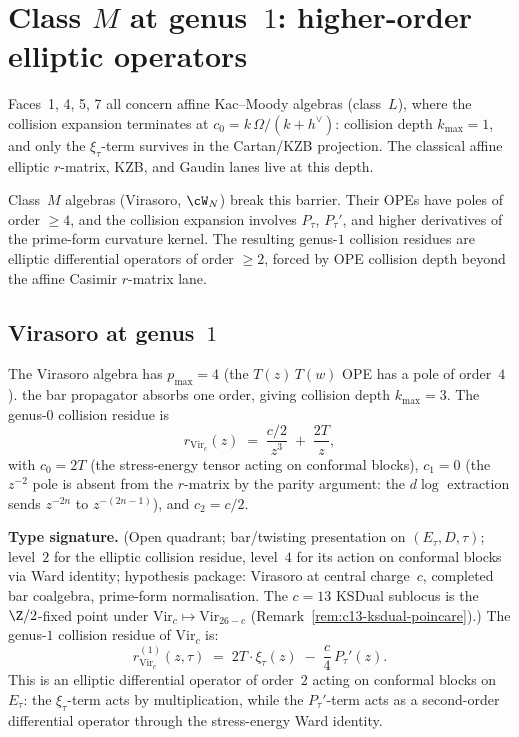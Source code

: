 \section{Class $M$ at genus~$1$: higher-order elliptic operators}
\label{sec:g1sf-class-m}

Faces~1, 4, 5, 7 all concern affine Kac--Moody algebras (class~$L$),
where the collision expansion terminates at
$c_0 = k\,\Omega/(k+h^\vee)$: collision depth $k_{\max} = 1$, and
only the $\xi_\tau$-term survives in the Cartan/KZB projection. The
classical affine elliptic $r$-matrix, KZB, and Gaudin lanes live at
this depth.

Class~$M$ algebras (Virasoro, $\cW_N$) break this barrier. Their
OPEs have poles of order $\geq 4$, and the collision expansion
involves $P_\tau$, $P_\tau'$, and higher derivatives of the
prime-form curvature kernel. The resulting genus-$1$ collision
residues are elliptic differential operators of order $\geq 2$, forced
by OPE collision depth beyond the affine Casimir $r$-matrix lane.

\subsection{Virasoro at genus~$1$}
\label{sec:g1sf-virasoro}

The Virasoro algebra has $p_{\max} = 4$ (the $T(z)\, T(w)$ OPE has a
pole of order~$4$). the bar propagator absorbs one order,
giving collision depth $k_{\max} = 3$. The genus-$0$ collision
residue is
\begin{equation}\label{eq:g1sf-vir-genus0}
r_{\mathrm{Vir}_c}(z)
\;=\;
\frac{c/2}{z^3}
\;+\;
\frac{2T}{z},
\end{equation}
with $c_0 = 2T$ (the stress-energy tensor acting on conformal
blocks), $c_1 = 0$ (the $z^{-2}$ pole is absent from the $r$-matrix
by the parity argument: the $d\log$ extraction sends
$z^{-2n}$ to $z^{-(2n-1)}$), and $c_2 = c/2$.

\begin{theorem}
\label{thm:g1sf-virasoro}
\textbf{Type signature.} (Open quadrant; bar/twisting presentation on
$(E_\tau, D, \tau)$; level~$2$ for the elliptic collision residue,
level~$4$ for its action on conformal blocks via Ward identity;
hypothesis package: Virasoro at central charge~$c$, completed
bar coalgebra, prime-form normalisation. The $c=13$ KSDual sublocus
is the $\Z/2$-fixed point under
$\mathrm{Vir}_c\mapsto\mathrm{Vir}_{26-c}$
\textup{(}Remark~\textup{\ref{rem:c13-ksdual-poincare}}\textup{)}.)
The genus-$1$ collision residue of $\mathrm{Vir}_c$ is:
\begin{equation}\label{eq:g1sf-vir-genus1}
r_{\mathrm{Vir}_c}^{(1)}(z, \tau)
\;=\;
2T \cdot \xi_\tau(z)
\;-\;
\frac{c}{4}\, P_\tau'(z).
\end{equation}
This is an elliptic differential operator of order~$2$ acting on
conformal blocks on $E_\tau$: the $\xi_\tau$-term acts by
multiplication, while the $P_\tau'$-term acts as a second-order
differential operator through the stress-energy Ward identity.
\end{theorem}

